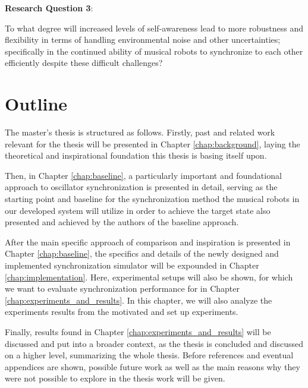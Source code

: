 \textbf{Research Question 3}:

To what degree will increased levels of self-awareness lead to more robustness and flexibility in terms of handling environmental noise and other uncertainties; specifically in the continued ability of musical robots to synchronize to each other efficiently despite these difficult challenges? \nl




\section{Outline}

The master's thesis is structured as follows. Firstly, past and related work relevant for the thesis will be presented in Chapter \ref{chap:background}, laying the theoretical and inspirational foundation this thesis is basing itself upon.

Then, in Chapter \ref{chap:baseline}, a particularly important and foundational approach to oscillator synchronization is presented in detail, serving as the starting point and baseline for the synchronization method the musical robots in our developed system will utilize in order to achieve the target state also presented and achieved by the authors of the baseline approach.

After the main specific approach of comparison and inspiration is presented in Chapter \ref{chap:baseline}, the specifics and details of the newly designed and implemented synchronization simulator will be expounded in Chapter \ref{chap:implementation}. Here, experimental setups will also be shown, for which we want to evaluate synchronization performance for in Chapter \ref{chap:experiments_and_results}. In this chapter, we will also analyze the experiments results from the motivated and set up experiments.

Finally, results found in Chapter \ref{chap:experiments_and_results} will be discussed and put into a broader context, as the thesis is concluded and discussed on a higher level, summarizing the whole thesis. Before references and eventual appendices are shown, possible future work as well as the main reasons why they were not possible to explore in the thesis work will be given.




